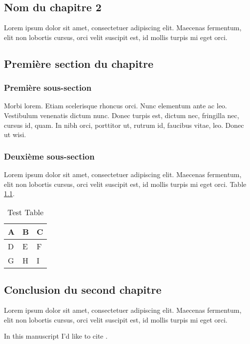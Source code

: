 \begin{bibunit}

\chapter[SHORT-Nom-du-chapitre-2]{Nom du chapitre 2}

Lorem ipsum dolor sit amet, consectetuer adipiscing elit. Maecenas fermentum, elit non lobortis cursus, orci velit suscipit est, id mollis turpis mi eget orci. 

\section{Première section du chapitre}

\subsection{Première sous-section}

Morbi lorem. Etiam scelerisque rhoncus orci. Nunc elementum ante ac leo. Vestibulum venenatis dictum nunc. Donec turpis est, dictum nec, fringilla nec, cursus id, quam. In nibh orci, porttitor ut, rutrum id, faucibus vitae, leo. Donec ut wisi.

\subsection{Deuxième sous-section}

Lorem ipsum dolor sit amet, consectetuer adipiscing elit. Maecenas fermentum, elit non lobortis cursus, orci velit suscipit est, id mollis turpis mi eget orci. Table \ref{table1}.

\begin{table}[hbt]
\begin{center}
\begin{tabular}{|l|l|l|}
\hline
A & B & C \\ \hline
D & E & F \\ \hline
G & H & I \\ \hline
\end{tabular}
\caption{Test Table}
\label{table1}
\end{center}
\end{table}

\section{Conclusion du second chapitre}

Lorem ipsum dolor sit amet, consectetuer adipiscing elit. Maecenas fermentum, elit non lobortis cursus, orci velit suscipit est, id mollis turpis mi eget orci.

In this manuscript I'd like to cite \cite{remo1,remo5}.

\end{bibunit}